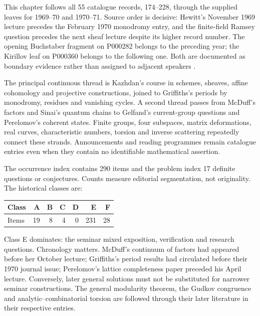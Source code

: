 This chapter follows all 55 catalogue records, 174--228, through the supplied
leaves for 1969--70 and 1970--71. Source order is decisive: Hewitt's November
1969 lecture precedes the February 1970 monodromy entry, and the finite-field
Ramsey question precedes the next sheaf lecture despite its higher record
number. The opening Buchstaber fragment on P000282 belongs to the preceding
year; the Kirillov leaf on P000360 belongs to the following one. Both are
documented as boundary evidence rather than assigned to adjacent speakers
\citep[catalogue, records 173--229]{mccme2026gelfand}.

The principal continuous thread is Kazhdan's course in schemes, sheaves,
affine cohomology and projective constructions, joined to Griffiths's
periods by monodromy, residues and vanishing cycles. A second thread passes
from McDuff's factors and Sinai's quantum chains to Gelfand's current-group
questions and Perelomov's coherent states. Finite groups, four subspaces,
matrix deformations, real curves, characteristic numbers, torsion and
inverse scattering repeatedly connect these strands. Announcements and
reading programmes remain catalogue entries even when they contain no
identifiable mathematical assertion.

The occurrence index contains 290 items and the problem index
17 definite questions or conjectures. Counts measure editorial
segmentation, not originality. The historical classes are:
\begin{center}
\begin{tabular}{lrrrrrr}
\toprule
Class&A&B&C&D&E&F\\
\midrule
Items&19&8&4&0&231&28\\
\bottomrule
\end{tabular}
\end{center}
Class E dominates: the seminar mixed exposition, verification and
research questions. Chronology matters.
McDuff's continuum of factors had appeared before her October lecture;
Griffiths's period results had circulated before their 1970 journal issue;
Perelomov's lattice completeness paper preceded his April lecture.
Conversely, later general solutions must not be substituted for narrower
seminar constructions. The general modularity theorem, the Gudkov
congruence and analytic--combinatorial torsion are followed through
their later literature in their respective entries.

